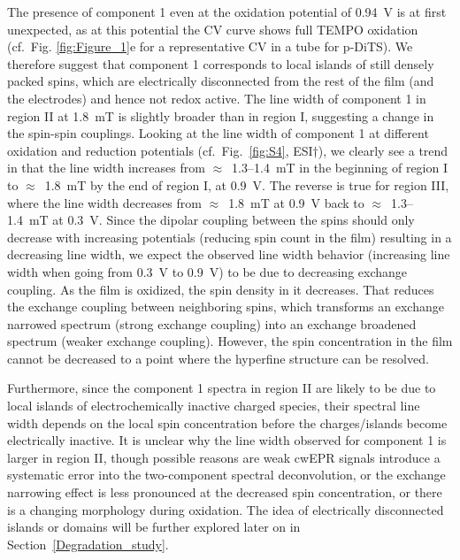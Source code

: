 \par
The presence of component 1 even at the oxidation potential of 0.94~V is at first unexpected, as at this potential the CV curve shows full TEMPO oxidation (cf.\ Fig. \ref{fig:Figure_1}e for a representative CV in a tube for p-DiTS). We therefore suggest that component 1 corresponds to local islands of still densely packed spins, which are electrically disconnected from the rest of the film (and the electrodes) and hence not redox active. The line width of component 1 in region II at 1.8~mT is slightly broader than in region I, suggesting a change in the spin-spin couplings. Looking at the line width of component 1 at different oxidation and reduction potentials (cf.\ Fig.~\ref{fig:S4}, ESI$\dag$), we clearly see a trend in that the line width increases from $\approx$~1.3--1.4~mT in the beginning of region I to $\approx$~1.8~mT by the end of region I, at 0.9~V. The reverse is true for region III, where the line width decreases from $\approx$~1.8~mT at 0.9~V back to $\approx$~1.3--1.4~mT at 0.3~V. Since the dipolar coupling between the spins should only decrease with increasing potentials (reducing spin count in the film) resulting in a decreasing line width, we expect the observed line width behavior (increasing line width when going from 0.3~V to 0.9~V) to be due to decreasing exchange coupling. As the film is oxidized, the spin density in it decreases. That reduces the exchange coupling between neighboring spins, which transforms an exchange narrowed spectrum (strong exchange coupling) into an exchange broadened spectrum (weaker exchange coupling). However, the spin concentration in the film cannot be decreased to a point where the hyperfine structure can be resolved.

\par
Furthermore, since the component 1 spectra in region II are likely to be due to local islands of electrochemically inactive charged species, their spectral line width depends on the local spin concentration before the charges/islands become electrically inactive. It is unclear why the line width observed for component 1 is larger in region II, though possible reasons are weak cwEPR signals introduce a systematic error into the two-component spectral deconvolution, or the exchange narrowing effect is less pronounced at the decreased spin concentration, or there is a changing morphology during oxidation. The idea of electrically disconnected islands or domains will be further explored later on in Section~\ref{Degradation_study}.

